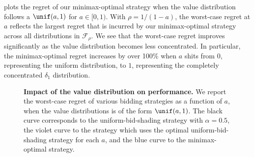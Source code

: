  plots the regret of our minimax-optimal strategy when the value distribution follows a $\unif(a,1)$ for $a \in [0,1)$. With $\rho = 1/(1 - a)$, the worst-case regret at $a$ reflects the largest regret that is incurred by our minimax-optimal strategy across all distributions in $\mathcal F_\rho$. We see that the worst-case regret improves significantly as the value distribution becomes less concentrated. In particular, the minimax-optimal regret increases by over 100\%  when $a$ shits from $0$, representing the uniform distribution, to $1$, representing the completely concentrated $\delta_1$ distribution.
\begin{figure}[h!]
    \centering
    \caption{\textbf{Impact of the value distribution on performance.} We report the worst-case regret of various bidding strategies as a function of $a$, when the value distributions is of the form $\unif(a,1)$. The black curve corresponds to the uniform-bid-shading strategy with $\alpha = 0.5$, the violet curve to the strategy which uses the optimal uniform-bid-shading strategy for each $a$, and the blue curve to the minimax-optimal strategy.} 
    \label{fig:regret_unif}
\end{figure}

